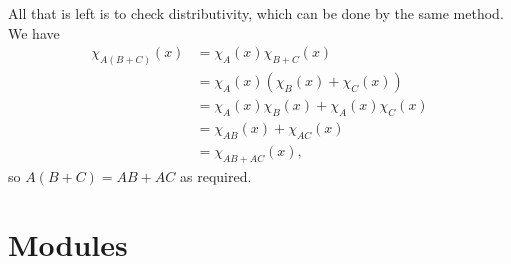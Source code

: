 \documentclass{amsart}
\renewcommand{\:}{\colon}
\theoremstyle{definition}
\renewenvironment{solution}{\SolutionAtEnd}{\endSolutionAtEnd}
\begin{document}
\begin{solution}
\begin{itemize}
   All that is left is to check distributivity, which can be done by
   the same method.  We have
   \begin{align*}
    \chi_{A(B+C)}(x) &= \chi_A(x) \chi_{B+C}(x) \\
                     &= \chi_A(x) (\chi_B(x) + \chi_C(x)) \\
                     &= \chi_A(x)\chi_B(x) + \chi_A(x)\chi_C(x) \\
                     &= \chi_{AB}(x) + \chi_{AC}(x) \\
                     &= \chi_{AB+AC}(x),
   \end{align*}
   so $A(B+C)=AB+AC$ as required.
 \end{itemize}
\end{solution}

\section{Modules}
\label{sec-modules}
\end{document}
